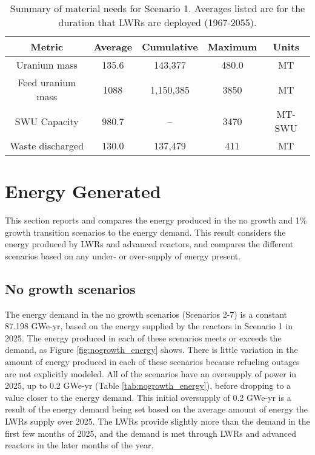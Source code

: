 \begin{table}[h!]
    \centering
    \caption{Summary of material needs for Scenario 1. Averages listed 
    are for the duration that \glspl{LWR} are deployed (1967-2055).}
    \label{tab:s1_results}
    \begin{tabular}{c c c c c}
        \hline 
        Metric & Average & Cumulative & Maximum & Units \\\hline
        Uranium mass & 135.6 & 143,377 & 480.0 & MT \\
        Feed uranium mass & 1088 & 1,150,385 & 3850 & MT \\
        SWU Capacity & 980.7 & -- & 3470 & MT-SWU \\
        Waste discharged & 130.0 & 137,479 & 411 & MT \\
        \hline        
    \end{tabular}
\end{table}

\section{Energy Generated} \label{sec:energy}
This section reports and compares the energy produced in the no growth and 
1\% growth transition scenarios to the energy demand. This result 
considers the energy produced by \glspl{LWR} and advanced reactors, 
and compares the different scenarios based on any under- or 
over-supply of energy present. 

\subsection{No growth scenarios}
The energy demand in the no growth scenarios (Scenarios 2-7) is a constant
87.198 GWe-yr, based on the energy supplied by the reactors in Scenario 1
in 2025. The energy produced in each of these scenarios meets or exceeds the 
demand, as Figure \ref{fig:nogrowth_energy} shows. There is little variation 
in the amount of energy produced in each of these scenarios because refueling 
outages are not explicitly modeled. All of the scenarios have an oversupply 
of power in 2025, up to 0.2 GWe-yr (Table \ref{tab:nogrowth_energy}), before 
dropping to a value closer to the energy demand. This initial oversupply 
of 0.2 GWe-yr is a result of the energy demand being set based on the average 
amount of energy the \glspl{LWR} supply over 2025. The \glspl{LWR} provide 
slightly more than the demand in the first few months of 2025, and the 
demand is met through \glspl{LWR} and advanced reactors in the later 
months of the year. 

